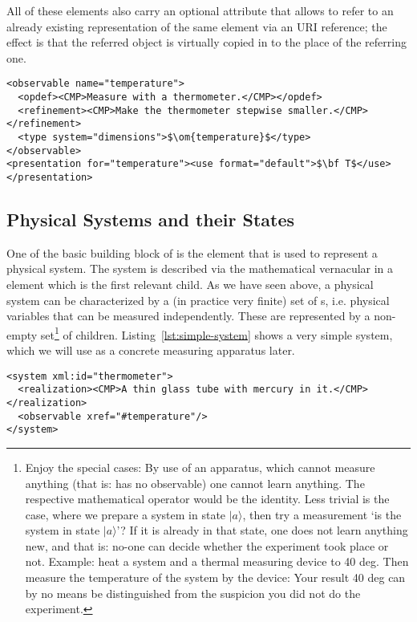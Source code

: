 All of these elements also carry an optional {} attribute that allows
to refer to an already existing representation of the same element via an URI reference;
the effect is that the referred object is virtually copied in to the place of the
referring one.

\begin{lstlisting}[label=lst:observable,mathescape,
  caption={An Observable for the Temperature},
  index={observable,opdef,refinement,type}]
<observable name="temperature">
  <opdef><CMP>Measure with a thermometer.</CMP></opdef>
  <refinement><CMP>Make the thermometer stepwise smaller.</CMP></refinement>
  <type system="dimensions">$\om{temperature}$</type>
</observable>
<presentation for="temperature"><use format="default">$\bf T$</use></presentation>
\end{lstlisting}


\subsection{Physical Systems and their States}\label{subsec:systems}

One of the basic building block of {\physml} is the {} element that is used
to represent a physical system. The system is described via the mathematical vernacular in
a {} element which is the first relevant child. As we have seen above,
a physical system can be characterized by a (in practice very finite) set of
{s}, i.e. physical variables that can be measured independently.
These are represented by a non-empty set\footnote{Enjoy the special cases: By use of an
  apparatus, which cannot measure anything (that is: has no observable) one cannot learn
  anything. The respective mathematical operator would be the identity.  Less trivial is
  the case, where we prepare a system in state $|a\rangle$, then try a measurement `is the
  system in state $|a\rangle$'? If it is already in that state, one does not learn
  anything new, and that is: no-one can decide whether the experiment took place or not.
  Example: heat a system and a thermal measuring device to 40 deg.  Then measure the
  temperature of the system by the device: Your result 40 deg can by no means be
  distinguished from the suspicion you did not do the experiment.}  of
{} children. Listing~\ref{lst:simple-system} shows a very simple
system, which we will use as a concrete measuring apparatus later.

\begin{lstlisting}[label=lst:simple-system,mathescape,
  caption={A Simple Physical System},
  index={theory,symbol}]
<system xml:id="thermometer">
  <realization><CMP>A thin glass tube with mercury in it.</CMP></realization>
  <observable xref="#temperature"/>
</system>
\end{lstlisting}

